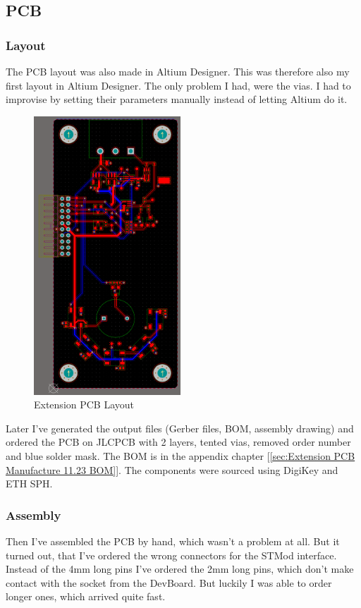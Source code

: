 \newpage
\subsection{PCB}
\subsubsection{Layout}

The PCB layout was also made in Altium Designer. This was therefore also my first layout in Altium Designer. The only problem I had, were the vias. I had to improvise by setting their parameters manually instead of letting Altium do it. 

\begin{figure}[H]
	\centering
	\includegraphics[width=5.5cm, page=2]{Resources/PCB_LAyout.png}
	\caption{Extension PCB Layout}
	\label{fig:Extension PCB Layout}
\end{figure}

Later I've generated the output files (Gerber files, BOM, assembly drawing) and ordered the PCB on JLCPCB with 2 layers, tented vias, removed order number and blue solder mask. The BOM is in the appendix chapter [\ref{sec:Extension PCB Manufacture 11.23 BOM}]. The components were sourced using DigiKey and ETH SPH.

\subsubsection{Assembly}

Then I've assembled the PCB by hand, which wasn't a problem at all. But it turned out, that I've ordered the wrong connectors for the STMod interface. Instead of the 4mm long pins I've ordered the 2mm long pins, which don't make contact with the socket from the DevBoard. But luckily I was able to order longer ones, which arrived quite fast.

